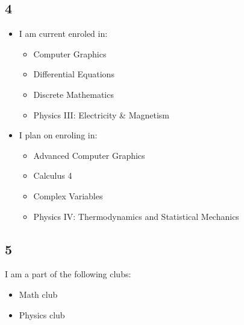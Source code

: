 \documentclass[11pt,a4paper,sans]{moderncv}
\begin{document}
\subsection{4}
\begin{itemize}
  \item I am current enroled in:
    \begin{itemize}
      \item Computer Graphics
      \item Differential Equations
      \item Discrete Mathematics
      \item Physics III: Electricity \& Magnetism
    \end{itemize}
  \item I plan on enroling in:
    \begin{itemize}
      \item Advanced Computer Graphics
      \item Calculus 4
      \item Complex Variables
      \item Physics IV: Thermodynamics and Statistical Mechanics
    \end{itemize}
\end{itemize}
\newpage
\subsection{5}
I am a part of the following clubs:
\begin{itemize}
  \item Math club
  \item Physics club
\end{itemize}
\end{document}
